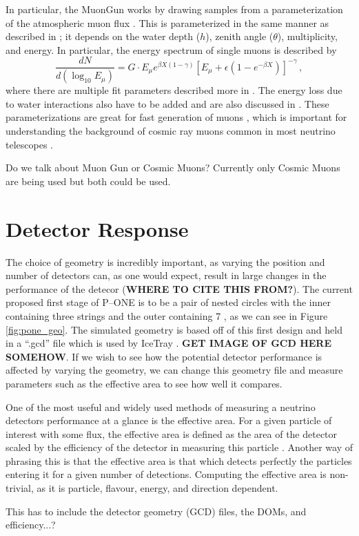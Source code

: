 In particular, the MuonGun works by drawing samples from a parameterization of the atmospheric muon flux \cite{icetray}. This is parameterized in the same manner as described in \cite{muon_flux}; it depends on the water depth ($h$), zenith angle ($\theta$), multiplicity, and energy. In particular, the energy spectrum of single muons is described by
\begin{equation}
  \frac{dN}{d(\log_{10}E_{\mu})} = G\cdot E_{\mu}e^{\beta X(1 - \gamma)}\left[E_{\mu} + \epsilon(1 - e^{-\beta X})\right]^{-\gamma}\, ,
\end{equation}
where there are multiple fit parameters described more in \cite{muon_flux}. The energy loss due to water interactions also have to be added and are also discussed in \cite{muon_flux}. These parameterizations are great for fast generation of muons \cite{muon_flux}, which is important for understanding the background of cosmic ray muons common in most neutrino telescopes \cite{icecube, antares, amanda, pone, muon_flux}. 

Do we talk about Muon Gun or Cosmic Muons? Currently only Cosmic Muons are being used but both could be used.

\section{Detector Response}

The choice of geometry is incredibly important, as varying the position and number of detectors can, as one would expect, result in large changes in the performance of the detecor (\textbf{WHERE TO CITE THIS FROM?}). The current proposed first stage of P--ONE is to be a pair of nested circles with the inner containing three strings and the outer containing 7 \cite{pone}, as we can see in Figure \ref{fig:pone_geo}. The simulated geometry is based off of this first design and held in a ``.gcd'' file which is used by IceTray \cite{icetray}. \textbf{GET IMAGE OF GCD HERE SOMEHOW}. If we wish to see how the potential detector performance is affected by varying the geometry, we can change this geometry file and measure parameters such as the effective area to see how well it compares.

One of the most useful and widely used methods of measuring a neutrino detectors performance at a glance is the effective area. For a given particle of interest with some flux, the effective area is defined as the area of the detector scaled by the efficiency of the detector in measuring this particle \cite{2010icecube}. Another way of phrasing this is that the effective area is that which detects perfectly the particles entering it for a given number of detections. Computing the effective area is non-trivial, as it is particle, flavour, energy, and direction dependent. 

This has to include the detector geometry (GCD) files, the DOMs, and efficiency...?

